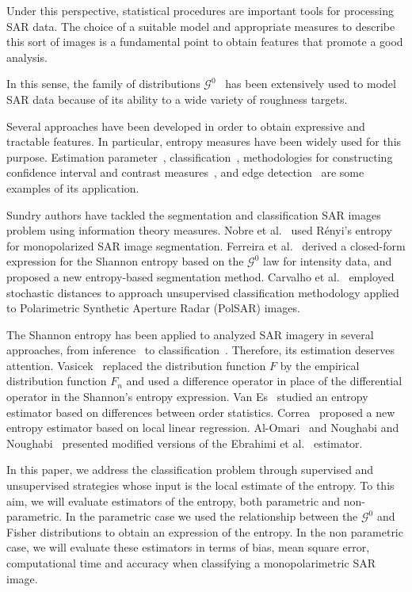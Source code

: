 \documentclass[journal]{IEEEtran}
\begin{document}
	Under this perspective, statistical procedures are important tools for processing SAR data. 
	The choice of a suitable model and appropriate measures to describe this sort of images is a fundamental point to obtain features that promote a good analysis.
	
	In this sense, the family of distributions $\mathcal{G}^0$~\cite{Frery97} has been extensively used to model SAR data because of its ability to a wide variety of roughness targets. 
	
	Several approaches have been developed in order to obtain expressive and tractable features. 
	In particular, entropy measures have been widely used for this purpose. 
	Estimation parameter~\cite{gambini2015}, classification~\cite{Carvalho2019}, methodologies for constructing
	confidence interval and contrast measures~\cite{Frery2012,Nascimento2009}, and edge detection~\cite{Nascimento2014} are some examples of its application.
	
	Sundry authors have tackled the segmentation and classification SAR images problem using information theory measures. 
	Nobre et al.~\cite{Nobre2016} used Rényi's entropy for monopolarized SAR image segmentation.
	Ferreira et al.~\cite{Ferreira2020} derived a closed-form expression for the Shannon entropy based on the $\mathcal{G}^0$ law for intensity data, and proposed a new entropy-based segmentation method. 
	Carvalho et al.~\cite{Carvalho2019} employed stochastic distances to approach unsupervised classification methodology applied to Polarimetric Synthetic Aperture Radar (PolSAR) images.
	
	The Shannon entropy has been applied to analyzed SAR imagery in several approaches, from inference~\cite{Frery2012} to classification~\cite{Ferreira2020}. 
	Therefore, its estimation deserves attention. 
	Vasicek~\cite{Vasicek76} replaced the distribution function $F$ by the empirical distribution function $F_n$ and used a difference operator in place of the differential operator in the Shannon's entropy expression. 
	Van Es~\cite{VanEs92} studied an entropy estimator based on differences between order statistics. 
	Correa~\cite{Correa95} proposed a new entropy estimator based on local linear regression.
	Al-Omari~\cite{AlOmari2016} and Noughabi and Noughabi~\cite{Noughabi13} presented modified versions of the Ebrahimi et al.~\cite{Ebrahimi94} estimator.
	
	In this paper, we address the classification problem through supervised and unsupervised strategies whose input is the local estimate of the entropy. 
	To this aim, we will evaluate estimators of the entropy, both parametric and non-parametric. 
	In the parametric case we used the relationship between the $\mathcal{G}^0$ and Fisher distributions to obtain an expression of the entropy. 
	In the non parametric case, we will evaluate these estimators in terms of bias, mean square error, computational time and accuracy when classifying a monopolarimetric SAR image. 
	
\end{document}

